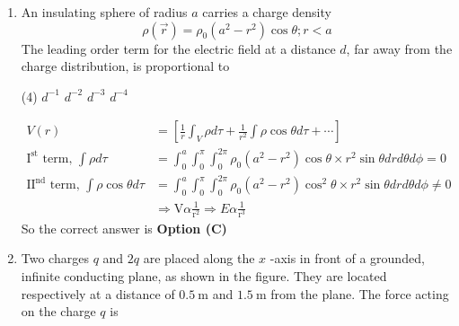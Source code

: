 \begin{enumerate}
	\item 	 An insulating sphere of radius $a$ carries a charge density
	$$
	\rho(\vec{r})=\rho_{0}\left(a^{2}-r^{2}\right) \cos \theta ; r<a
	$$
	The leading order term for the electric field at a distance $d$, far away from the charge distribution, is proportional to
	{}

\begin{tasks}(4)
\task[\textbf{A.}] $d^{-1}$
\task[\textbf{B.}] $d^{-2}$
\task[\textbf{C.}] $d^{-3}$
\task[\textbf{D.}] $d^{-4}$
\end{tasks}
\begin{answer}
	\begin{align*}
	V(r)&=\left[\frac{1}{r} \int_{V} \rho d \tau+\frac{1}{r^{2}} \int \rho \cos \theta d \tau+\cdots\right]\\
	\mathrm{I}^{\mathrm{st}}\text{ term, }\int \rho d \tau&=\int_{0}^{a} \int_{0}^{\pi} \int_{0}^{2 \pi} \rho_{0}\left(a^{2}-r^{2}\right) \cos \theta \times r^{2} \sin \theta d r d \theta d \phi=0\\
	\mathrm{II}^{\mathrm{nd}}\text{ term, }\int \rho \cos \theta d \tau&=\int_{0}^{a} \int_{0}^{\pi} \int_{0}^{2 \pi} \rho_{0}\left(a^{2}-r^{2}\right) \cos ^{2} \theta \times r^{2} \sin \theta d r d \theta d \phi \neq 0\\
	&\Rightarrow \mathrm{V} \alpha \frac{1}{\mathrm{r}^{2}} \Rightarrow E \alpha \frac{1}{\mathrm{r}^{3}}
	\end{align*}
	So the correct answer is \textbf{Option (C)}
\end{answer}
\item Two charges $q$ and $2 q$ are placed along the $x$ -axis in front of a grounded, infinite conducting plane, as shown in the figure. They are located respectively at a distance of $0.5 \mathrm{~m}$ and $1.5 \mathrm{~m}$ from the plane. The force acting on the charge $q$ is
{}


\end{enumerate}
